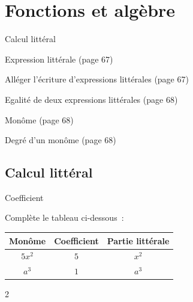 \documentclass[a4paper,11pt]{report}
\begin{document}
\newcommand{\chapterName}{Fonctions et algèbre}
\newcommand{\serieName}{Calcul littéral}

\chapter*{\chapterName}
\thispagestyle{empty}

\begin{amL}{\serieName}{
\item Expression littérale (page 67)
\item Alléger l'écriture d'expressions littérales (page 67)
\item Egalité de deux expressions littérales (page 68)
\item Monôme (page 68)
\item Degré d'un monôme (page 68)
}
\end{amL}
\section*{\serieName}
\setcounter{page}{1}
\thispagestyle{firstPage}


\vspace{-0.5cm}

\begin{QSJ}{92}{2}
\end{QSJ}

\begin{resolu}{Coefficient}
{ 
\vspace{-0.2cm}
	Complète le tableau ci-dessous~:
\vspace{-0.2cm}
\begin{center}
\begin{tabular}{|c|c|c|}
 \hline
   Monôme & Coefficient & Partie littérale\\   
\hline
$ 5x^2 $ &    $5$  & $x^2$ \\
 \hline
$a^3$ &$1$&$a^3$ \\
\hline  
\end{tabular}%
\end{center}
\vspace{-0.6cm}
}
{2}
\end{resolu}
\end{document}
